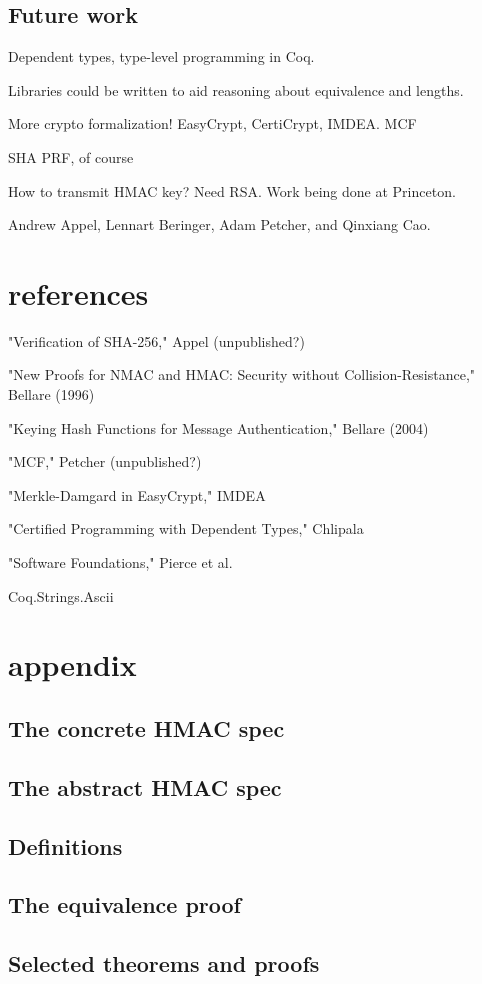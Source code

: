 \documentclass[twocolumn,showpacs,%
  nofootinbib,aps,superscriptaddress,%
  eqsecnum,prd,notitlepage,showkeys,10pt]{revtex4-1}
\begin{document}
\subsection{Future work}

Dependent types, type-level programming in Coq.

Libraries could be written to aid reasoning about equivalence and lengths.

More crypto formalization! EasyCrypt, CertiCrypt, IMDEA. MCF

SHA PRF, of course

How to transmit HMAC key? Need RSA. Work being done at Princeton.


\begin{acknowledgments}

Andrew Appel, Lennart Beringer, Adam Petcher, and Qinxiang Cao.

\end{acknowledgments}

\section{references}

"Verification of SHA-256," Appel (unpublished?)

"New Proofs for NMAC and HMAC: Security without Collision-Resistance," Bellare (1996)

"Keying Hash Functions for Message Authentication," Bellare (2004)

"MCF," Petcher (unpublished?)

"Merkle-Damgard in EasyCrypt," IMDEA

"Certified Programming with Dependent Types," Chlipala

"Software Foundations," Pierce et al.

Coq.Strings.Ascii

\section{appendix}

\subsection{The concrete HMAC spec}

\subsection{The abstract HMAC spec}

\subsection{Definitions}

\subsection{The equivalence proof}

\subsection{Selected theorems and proofs}
\end{document}
